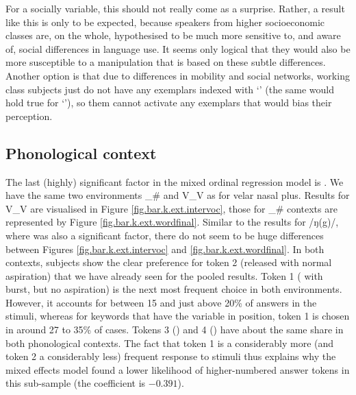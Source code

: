 For a socially  variable, this should not really come as a surprise.
Rather, a result like this is only to be expected, because speakers from higher socioeconomic classes are, on the whole, hypothesised to be much more sensitive to, and aware of, social differences in language use.
It seems only logical that they would also be more susceptible to a manipulation that is based on these subtle differences.
Another option is that due to differences in mobility and social networks, working class subjects just do not have any exemplars indexed with `' (the same would hold true for `'), so  them cannot activate any exemplars that would bias their perception.

\subsection{Phonological context}
\label{sec.perc_res.k.phon}

The last (highly) significant factor in the mixed ordinal regression model is .
We have the same two environments \_\# and V\_V as for velar nasal plus.
Results for V\_V are visualised in Figure \ref{fig.bar.k.ext.intervoc}, those for \_\# contexts are represented by Figure \ref{fig.bar.k.ext.wordfinal}.
Similar to the results for /ŋ(g)/, where  was also a significant factor, there do not seem to be huge differences between Figures \ref{fig.bar.k.ext.intervoc} and \ref{fig.bar.k.ext.wordfinal}.
In both contexts, subjects show the clear preference for token 2 (released  with normal aspiration) that we have already seen for the pooled results.
Token 1 ( with burst, but no aspiration) is the next most frequent choice in both environments.
However, it accounts for between 15 and just above 20\% of answers in the  stimuli, whereas for keywords that have the variable in  position, token 1 is chosen in around 27 to 35\% of cases.
Tokens 3 () and 4 () have about the same share in both phonological contexts.
The fact that token 1 is a considerably more (and token 2 a considerably less) frequent response to  stimuli thus explains why the mixed effects model found a lower likelihood of higher-numbered answer tokens in this sub-sample (the coefficient is \ensuremath{-0.391}).

